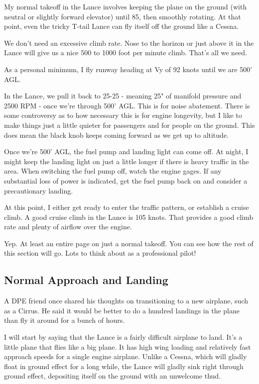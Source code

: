 My normal takeoff in the Lance involves keeping the plane on the ground (with neutral or slightly forward elevator) until 85, then smoothly rotating. At that point, even the tricky T-tail Lance can fly itself off the ground like a Cessna.

We don't need an excessive climb rate. Nose to the horizon or just above it in the Lance will give us a nice 500 to 1000 foot per minute climb. That's all we need.

As a personal minimum, I fly runway heading at Vy of 92 knots until we are 500' AGL.

In the Lance, we pull it back to 25-25 - meaning 25" of manifold pressure and 2500 RPM - once we're through 500' AGL. This is for noise abatement. There is some controversy as to how necessary this is for engine longevity, but I like to make things just a little quieter for passengers and for people on the ground. This does mean the black knob keeps coming forward as we get up to altitude.

Once we're 500' AGL, the fuel pump and landing light can come off. At night, I might keep the landing light on just a little longer if there is heavy traffic in the area. When switching the fuel pump off, watch the engine gages. If any substantial loss of power is indicated, get the fuel pump back on and consider a precautionary landing.

At this point, I either get ready to enter the traffic pattern, or establish a cruise climb. A good cruise climb in the Lance is 105 knots. That provides a good climb rate and plenty of airflow over the engine.

Yep. At least an entire page on just a normal takeoff. You can see how the rest of this section will go. Lots to think about as a professional pilot!

\subsection{Normal Approach and Landing}

A DPE friend once shared his thoughts on transitioning to a new airplane, such as a Cirrus. He said it would be better to do a hundred landings in the plane than fly it around for a bunch of hours.

I will start by saying that the Lance is a fairly difficult airplane to land. It's a little plane that flies like a big plane. It has high wing loading and relatively fast approach speeds for a single engine airplane. Unlike a Cessna, which will gladly float in ground effect for a long while, the Lance will gladly sink right through ground effect, depositing itself on the ground with an unwelcome thud.

